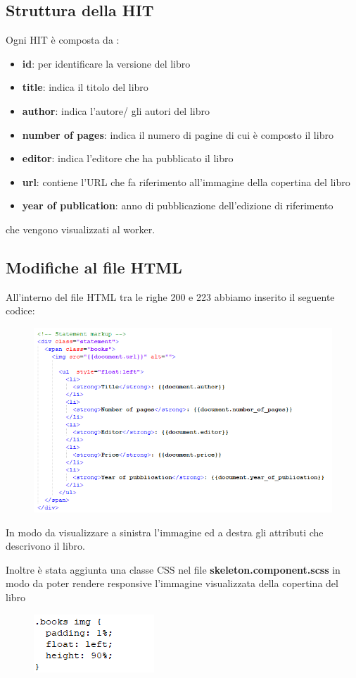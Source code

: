 \documentclass[a4paper,11pt]{report}
\begin{document}
\subsection{Struttura della HIT}
Ogni HIT è composta da : 
\begin{itemize}
	\item \textbf{id}: per identificare la versione del libro
	\item \textbf{title}: indica il titolo del libro
	\item \textbf{author}: indica l'autore/ gli autori del libro
	\item \textbf{number of pages}: indica il numero di pagine di cui è composto il libro
	\item \textbf{editor}: indica l'editore che ha pubblicato il libro
	\item \textbf{url}: contiene l'URL che fa riferimento all'immagine della copertina del libro
	\item \textbf{year of publication}: anno di pubblicazione dell'edizione di riferimento
\end{itemize}
che vengono visualizzati al worker.
 \pagebreak
\subsection{Modifiche al file HTML}
All'interno del file HTML tra le righe 200 e 223 abbiamo inserito il seguente codice: \\
\begin{figure}[h]
	\centering
	\includegraphics[width=0.9\linewidth]{statement}
	\label{fig:statement}
\end{figure}
In modo da visualizzare a sinistra l'immagine ed a destra gli attributi che descrivono il libro.

Inoltre è stata aggiunta una classe CSS nel file \textbf{skeleton.component.scss} in modo da poter rendere responsive l'immagine visualizzata della copertina del libro
\begin{figure}[h]
	\includegraphics[width=0.3\linewidth]{css}
	\label{fig:css}
\end{figure}
\end{document}
